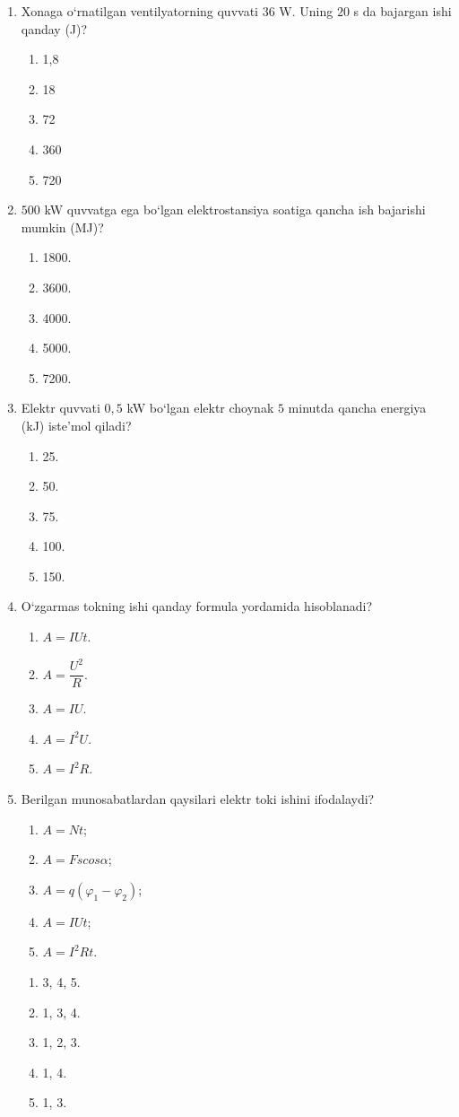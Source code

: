 \begin{enumerate}
\item Xonaga o‘rnatilgan ventilyatorning quvvati $36$ W. Uning $20$ s da bajargan ishi qanday (J)?
\begin{enumerate}[label=\Alph*)]
\item 1,8
\item 18
\item 72
\item 360
\item 720
\end{enumerate}

\item $500$ kW quvvatga ega bo‘lgan elektrostansiya soatiga qancha ish bajarishi mumkin (MJ)?
\begin{enumerate}[label=\Alph*)]
\item 1800.
\item 3600.
\item 4000.
\item 5000.
\item 7200.
\end{enumerate}

\item Elektr quvvati $0,5$ kW bo‘lgan elektr choynak $5$ minutda qancha energiya (kJ) iste’mol qiladi?
\begin{enumerate}[label=\Alph*)]
\item 25.
\item 50.
\item 75.
\item 100.
\item 150.
\end{enumerate}

\item O‘zgarmas tokning ishi qanday formula yordamida hisoblanadi?
\begin{enumerate}[label=\Alph*)]
\item $A=IUt$.
\item $A=\dfrac{U^2}{R}$.
\item $A=IU$.
\item $A=I^2U$.
\item $A=I^2R$.
\end{enumerate}

\item Berilgan munosabatlardan qaysilari elektr toki ishini ifodalaydi?
\begin{enumerate}
\item $A=Nt$;
\item $A=Fscos\alpha$;
\item $A=q(\varphi_1-\varphi_2)$;
\item $A=IUt$;
\item $A=I^2Rt$.
\end{enumerate}
\begin{enumerate}[label=\Alph*)]
\item 3, 4, 5.
\item 1, 3, 4.
\item 1, 2, 3.
\item 1, 4.
\item 1, 3.
\end{enumerate}


\end{enumerate}
